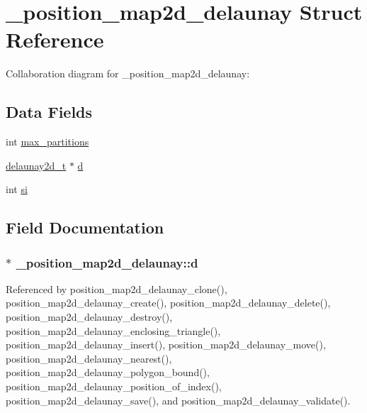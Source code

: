 \hypertarget{struct__position__map2d__delaunay}{}\section{\+\_\+position\+\_\+map2d\+\_\+delaunay Struct Reference}
\label{struct__position__map2d__delaunay}


Collaboration diagram for \+\_\+position\+\_\+map2d\+\_\+delaunay\+:
\subsection*{Data Fields}
\begin{DoxyCompactItemize}
\item 
int \hyperlink{struct__position__map2d__delaunay_a73d111d78cd506ebc0ff453458249eb0}{max\+\_\+partitions}
\item 
\hyperlink{delaunay2d_8h_a46484f185b22e7d33791056748306f9e}{delaunay2d\+\_\+t} $\ast$ \hyperlink{struct__position__map2d__delaunay_a8572efdc928606117b83858e6a58aa72}{d}
\item 
int \hyperlink{struct__position__map2d__delaunay_a34e3a76b0bbc3b0d0fb340a561a58050}{si}
\end{DoxyCompactItemize}


\subsection{Field Documentation}
\subsubsection[{\texorpdfstring{d}{d}}]{$\ast$ \+\_\+position\+\_\+map2d\+\_\+delaunay\+::d}\hypertarget{struct__position__map2d__delaunay_a8572efdc928606117b83858e6a58aa72}{}\label{struct__position__map2d__delaunay_a8572efdc928606117b83858e6a58aa72}


Referenced by position\+\_\+map2d\+\_\+delaunay\+\_\+clone(), position\+\_\+map2d\+\_\+delaunay\+\_\+create(), position\+\_\+map2d\+\_\+delaunay\+\_\+delete(), position\+\_\+map2d\+\_\+delaunay\+\_\+destroy(), position\+\_\+map2d\+\_\+delaunay\+\_\+enclosing\+\_\+triangle(), position\+\_\+map2d\+\_\+delaunay\+\_\+insert(), position\+\_\+map2d\+\_\+delaunay\+\_\+move(), position\+\_\+map2d\+\_\+delaunay\+\_\+nearest(), position\+\_\+map2d\+\_\+delaunay\+\_\+polygon\+\_\+bound(), position\+\_\+map2d\+\_\+delaunay\+\_\+position\+\_\+of\+\_\+index(), position\+\_\+map2d\+\_\+delaunay\+\_\+save(), and position\+\_\+map2d\+\_\+delaunay\+\_\+validate().

